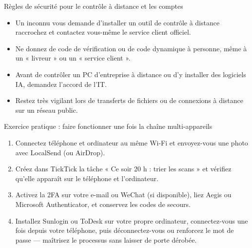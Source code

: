 \begin{tcbwarn}{Règles de sécurité pour le contrôle à distance et les comptes}
\begin{itemize}
  \item Un inconnu vous demande d'installer un outil de contrôle à distance raccrochez et contactez vous-même le service client officiel.
  \item Ne donnez de code de vérification ou de code dynamique à personne, même à un « livreur » ou un « service client ».
  \item Avant de contrôler un PC d'entreprise à distance ou d'y installer des logiciels IA, demandez l'accord de l'IT.
  \item Restez très vigilant lors de transferts de fichiers ou de connexions à distance sur un réseau public.
\end{itemize}

\end{tcbwarn}

\begin{tcbpractice}{Exercice pratique : faire fonctionner une fois la chaîne multi-appareils}
\begin{enumerate}
  \item Connectez téléphone et ordinateur au même Wi-Fi et envoyez-vous une photo avec LocalSend (ou AirDrop).
  \item Créez dans TickTick la tâche « Ce soir 20 h : trier les scans » et vérifiez qu'elle apparaît sur le téléphone et l'ordinateur.
  \item Activez la 2FA sur votre e-mail ou WeChat (si disponible), liez Aegis ou Microsoft Authenticator, et conservez les codes de secours.
  \item Installez Sunlogin ou ToDesk sur votre propre ordinateur, connectez-vous une fois depuis votre téléphone, puis déconnectez-vous ou renforcez le mot de passe — maîtrisez le processus sans laisser de porte dérobée.
\end{enumerate}

\end{tcbpractice}
